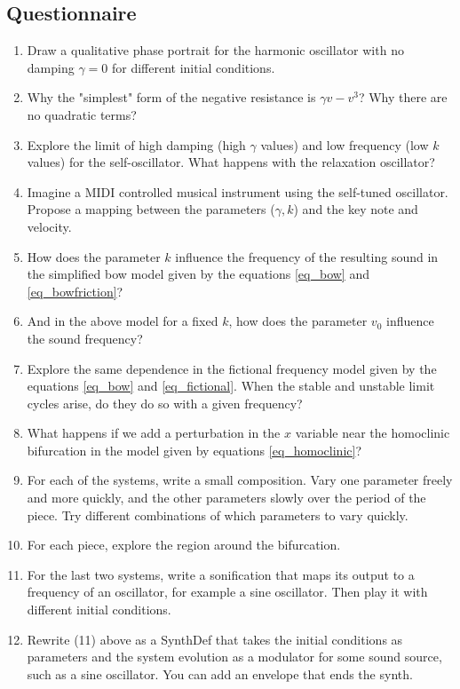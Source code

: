 \documentclass{article}
\begin{document}
\subsection{Questionnaire}
\begin{enumerate}
\item Draw a qualitative phase portrait for the harmonic oscillator with no damping $\gamma=0$ for different initial conditions.
\item Why the "simplest" form of the negative resistance is $\gamma v - v^3$? Why there are no quadratic terms?
\item Explore the limit of high damping (high $\gamma$ values) and low frequency (low $k$ values) for the self-oscillator. What happens with the relaxation oscillator?
\item Imagine a MIDI controlled musical instrument using the self-tuned oscillator. Propose a mapping between the parameters ($\gamma,k$) and the key note and velocity. 
\item How does the parameter $k$ influence the frequency of the resulting sound in the simplified bow model given by the equations \ref{eq_bow} and \ref{eq_bowfriction}? 
\item And in the above model for a fixed $k$, how does the parameter $v_0$ influence the sound frequency?
\item Explore the same dependence in the fictional frequency model given by the equations \ref{eq_bow} and \ref{eq_fictional}. When the stable and unstable limit cycles arise, do they do so with a given frequency?
\item What happens if we add a perturbation in the $x$ variable near the homoclinic bifurcation in the model given by equations \ref{eq_homoclinic}?
\item For each of the systems, write a small composition. Vary one parameter freely and more quickly, and the other parameters slowly over the period of the piece. Try different combinations of which parameters to vary quickly. 
\item For each piece, explore the region around the bifurcation.
\item For the last two systems, write a sonification that maps its output to a frequency of an oscillator, for example a sine oscillator. Then play it with different initial conditions. 
\item Rewrite (11) above as a SynthDef that takes the initial conditions as parameters and the system evolution as a modulator for some sound source, such as a sine oscillator. You can add an envelope that ends the synth.
\end{enumerate}
\end{document}

